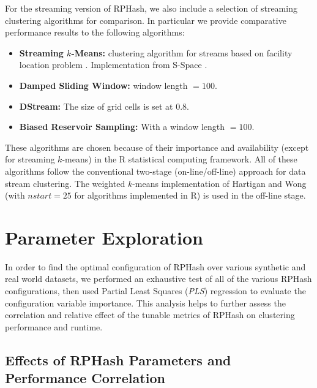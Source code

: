 For the streaming version of \textsf{RPHash}, we also include a selection of streaming clustering algorithms
for comparison.  In particular we provide comparative performance results to the following
algorithms: 

\label{streamingalgos}
\begin{itemize}
 \item \textbf{Streaming $k$-Means:} clustering algorithm for streams based on facility location
   problem \cite{braverman}.  Implementation from S-Space \cite{sspace}.
 \item \textbf{Damped Sliding Window:} \cite{zhu} window length $=100$.
 \item \textbf{DStream:} \cite{dstream} The size of grid cells is set at 0.8.
 \item \textbf{Biased Reservoir Sampling:} \cite{ccaggarwal} With a window length $=100$. 
\end{itemize}

\noindent
These algorithms are chosen because of their importance and availability (except for streaming
$k$-means) in the R statistical computing framework.  All of these algorithms follow the
conventional two-stage (on-line/off-line) approach for data stream clustering.  The weighted
$k$-means implementation of Hartigan and Wong (with $nstart = 25$ for algorithms implemented in R)
is used in the off-line stage.

\section{Parameter Exploration}\label{optimalconf}

In order to find the optimal configuration of \textsf{RPHash} over various synthetic and real world datasets,
we performed an exhaustive test of all of the various \textsf{RPHash} configurations, then used Partial Least
Squares (\emph{PLS}) regression to evaluate the configuration variable importance.  This analysis
helps to further assess the correlation and relative effect of the tunable metrics of
\textsf{RPHash} on clustering performance and runtime.

\subsection{Effects of \textsf{RPHash} Parameters and Performance Correlation}


